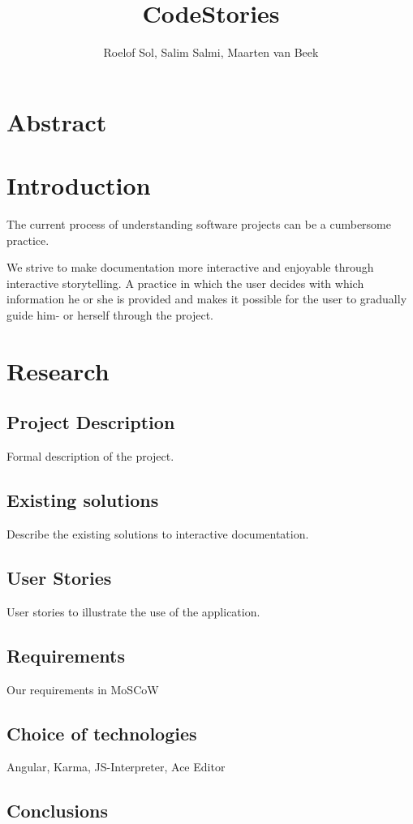 \documentclass[12pt]{article}
\title{CodeStories}
\author{Roelof Sol, Salim Salmi, Maarten van Beek}
\date{}
\begin{document}
 
\maketitle
\section{Abstract}
\section{Introduction}
The current process of understanding software projects can be a cumbersome practice. 

We strive to make documentation more interactive and enjoyable through interactive storytelling. A practice in which the user 
decides with which information he or she is provided and makes it possible for the user to gradually guide him- or herself 
through the project.  

\section{Research}
\subsection{Project Description}
Formal description of the project. 

\subsection{Existing solutions}
Describe the existing solutions to interactive documentation.

\subsection{User Stories}
User stories to illustrate the use of the application. 

\subsection{Requirements}
Our requirements in MoSCoW

\subsection{Choice of technologies}
Angular, Karma, JS-Interpreter, Ace Editor

\subsection{Conclusions}
\end{document}
